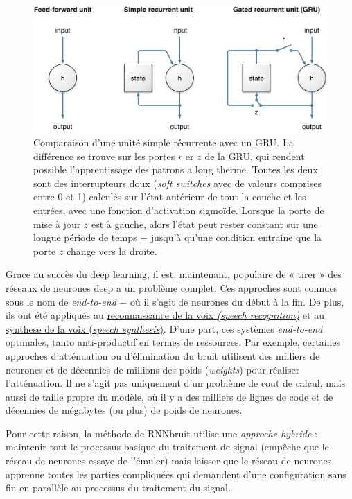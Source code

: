 \documentclass[conference,onecolumn]{IEEEtran}
\begin{document}
 \begin{figure}[H]
 \centering
    \includegraphics[scale=0.7]{simple_vs_gru.png}
    \caption{Comparaison d’une unité simple récurrente avec un GRU. La différence se trouve sur les portes $r$ er $z$ de la GRU, qui rendent possible l’apprentissage des patrons a long therme. Toutes les deux sont des interrupteurs doux (\textit{soft switches} avec de valeurs comprises entre 0 et 1) calculés sur l’état antérieur de tout la couche et les entrées, avec une fonction d’activation sigmoïde. Lorsque la porte de mise à jour $z$ est à gauche, alors l’état peut rester constant sur une longue période de temps $-$ jusqu’à  qu’une condition entraine que la porte $z$ change vers la droite.} 
\end{figure}
Grace au succès du deep learning, il est, maintenant, populaire de « tirer » des réseaux de neurones deep a un problème complet. Ces approches sont connues sous le nom de \textit{end-to-end} $-$ où il s’agit de neurones du début à la fin. De plus, ils ont été appliqués au \href{https://arxiv.org/pdf/1412.5567.pdf}{reconnaissance de la voix \textit{(speech recognition)}} et au \href{https://deepmind.com/blog/article/wavenet-generative-model-raw-audio}{synthese de la voix (\textit{speech synthesis})}. D’une part, ces systèmes \textit{end-to-end} optimales, tanto anti-productif en termes de ressources. Par exemple, certaines approches d’atténuation  ou d’élimination du bruit utilisent des milliers de neurones et de décennies de millions des poids  (\textit{weights}) pour réaliser l’atténuation. Il ne s’agit pas uniquement d’un problème de cout de calcul, mais aussi de taille propre du modèle, où il y a des milliers de lignes de code et de décennies de mégabytes (ou plus) de poids de neurones.  

Pour cette raison, la méthode de RNNbruit utilise une \textit{approche hybride} : maintenir tout le processus basique du traitement de signal (empêche que le réseau de neurones essaye de l’émuler) mais laisser que le réseau de neurones apprenne toutes les parties compliquées qui demandent d’une configuration sans fin en parallèle au processus du traitement du signal.
\end{document}
